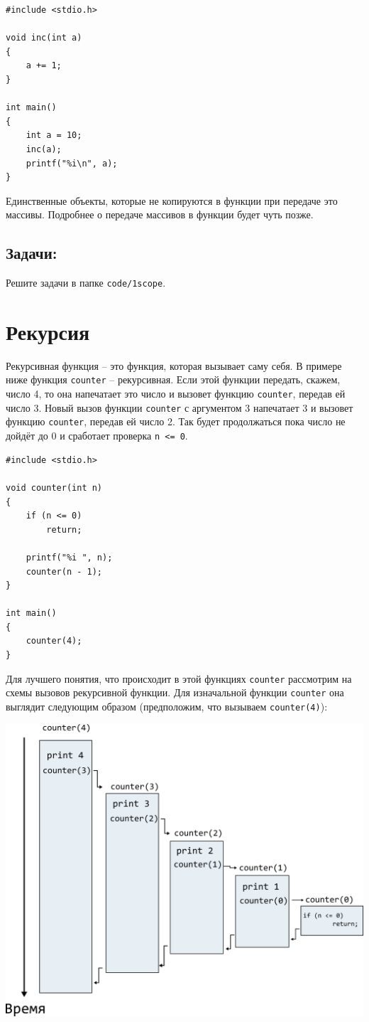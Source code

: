 \documentclass{article}
\begin{document}
\begin{lstlisting}
#include <stdio.h>

void inc(int a)
{
    a += 1;
}

int main()
{
    int a = 10;
    inc(a);
    printf("%i\n", a);
}
\end{lstlisting}

Единственные объекты, которые не копируются в функции при передаче это массивы. Подробнее о передаче массивов в функции будет чуть позже.

\subsection*{Задачи:}
Решите задачи в папке \texttt{code/1scope}.

\newpage
\section*{Рекурсия}
Рекурсивная функция -- это функция, которая вызывает саму себя.  В примере ниже функция \texttt{counter} -- рекурсивная. Если этой функции передать, скажем, число 4, то она напечатает это число и вызовет функцию \texttt{counter}, передав ей число 3. Новый вызов функции \texttt{counter} с аргументом 3 напечатает 3 и вызовет функцию \texttt{counter}, передав ей число 2. Так будет продолжаться пока число не дойдёт до 0 и сработает проверка \texttt{n <= 0}.
\begin{lstlisting}
#include <stdio.h>

void counter(int n) 
{
    if (n <= 0)
        return;

    printf("%i ", n);
    counter(n - 1);
}

int main() 
{
    counter(4);
}
\end{lstlisting}

Для лучшего понятия, что происходит в этой функциях \texttt{counter} рассмотрим на схемы вызовов рекурсивной функции. Для изначальной функции \texttt{counter} она выглядит следующим образом (предположим, что вызываем \texttt{counter(4)}):


\begin{center}
\includegraphics[scale=0.67]{../images/counterini.png}
\end{center}
\end{document}
